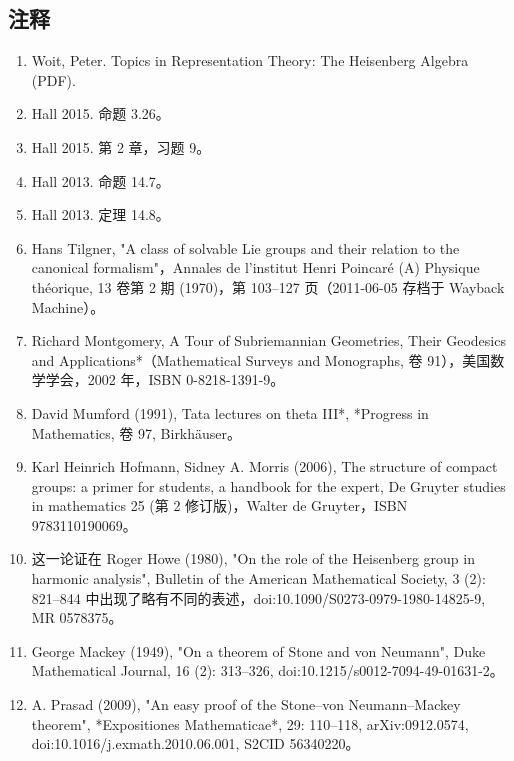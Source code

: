 \subsection{注释}
\begin{enumerate}
\item Woit, Peter. Topics in Representation Theory: The Heisenberg Algebra (PDF).
\item Hall 2015. 命题 3.26。
\item Hall 2015. 第 2 章，习题 9。
\item Hall 2013. 命题 14.7。
\item Hall 2013. 定理 14.8。
\item Hans Tilgner, "A class of solvable Lie groups and their relation to the canonical formalism"，Annales de l'institut Henri Poincaré (A) Physique théorique, 13 卷第 2 期 (1970)，第 103–127 页（2011-06-05 存档于 Wayback Machine）。
\item Richard Montgomery, A Tour of Subriemannian Geometries, Their Geodesics and Applications*（Mathematical Surveys and Monographs, 卷 91），美国数学学会，2002 年，ISBN 0-8218-1391-9。
\item David Mumford (1991), Tata lectures on theta III*, *Progress in Mathematics, 卷 97, Birkhäuser。
\item Karl Heinrich Hofmann, Sidney A. Morris (2006), The structure of compact groups: a primer for students, a handbook for the expert, De Gruyter studies in mathematics 25 (第 2 修订版)，Walter de Gruyter，ISBN 9783110190069。
\item 这一论证在 Roger Howe (1980), "On the role of the Heisenberg group in harmonic analysis", Bulletin of the American Mathematical Society, 3 (2): 821–844 中出现了略有不同的表述，doi:10.1090/S0273-0979-1980-14825-9, MR 0578375。
\item George Mackey (1949), "On a theorem of Stone and von Neumann", Duke Mathematical Journal, 16 (2): 313–326, doi:10.1215/s0012-7094-49-01631-2。
\item A. Prasad (2009), "An easy proof of the Stone–von Neumann–Mackey theorem", *Expositiones Mathematicae*, 29: 110–118, arXiv:0912.0574, doi:10.1016/j.exmath.2010.06.001, S2CID 56340220。
\end{enumerate}
